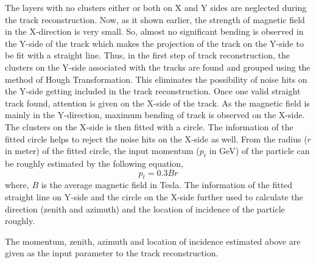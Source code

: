 The layers with no clusters either or both on X and Y sides are
neglected during the track reconstruction.
Now, as it shown earlier, the strength of magnetic field in the
X-direction is very small. So, almost no significant bending is
observed in the Y-side of the track which makes the projection of
the track on the Y-side to be fit with a straight line.
Thus, in the first step of track reconstruction, the clusters on
the Y-side associated with the tracks are found and grouped using
the method of Hough Transformation\cite{hought}. This eliminates
the possibility of noise hits on the Y-side getting included in the
track reconstruction. Once one valid straight track found, attention
is given on the X-side of the track. As the magnetic field is mainly
in the Y-direction, maximum bending of track is observed on the X-side.
The clusters on the X-side is then fitted with a circle.
The information of the fitted circle helps to reject the noise hits
on the X-side as well.
From the radius ($r$ in meter) of the fitted circle, the input
momentum ($p_t$ in GeV) of the particle can be roughly estimated by
the following equation,
\begin{equation}
  p_t=0.3Br \label{eq:pt_est}
\end{equation}
where, $B$ is the average magnetic field in Tesla.
The information of the fitted straight line on Y-side and the circle
on the X-side further used to calculate the direction (zenith and
azimuth) and the location of incidence of the particle roughly.

The momentum, zenith, azimuth and location of incidence estimated
above are given as the input parameter to the track reconstruction.
